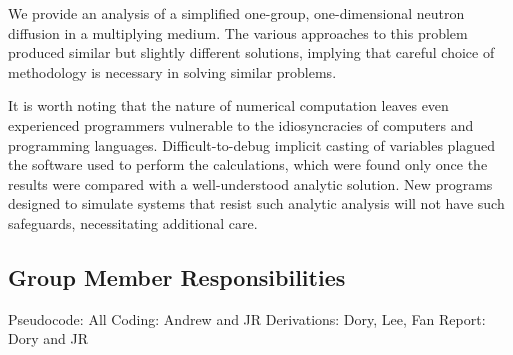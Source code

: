 \documentclass[../main.tex]{subfiles}
\begin{document}
	We provide an analysis of a simplified one-group, one-dimensional neutron diffusion in a multiplying medium. The various approaches to this problem produced similar but slightly different solutions, implying that careful choice of methodology is necessary in solving similar problems. 

	It is worth noting that the nature of numerical computation leaves even experienced programmers vulnerable to the idiosyncracies of computers and programming languages. Difficult-to-debug implicit casting of variables plagued the software used to perform the calculations, which were found only once the results were compared with a well-understood analytic solution. New programs designed to simulate systems that resist such analytic analysis will not have such safeguards, necessitating additional care.

\subsection{Group Member Responsibilities}
Pseudocode: All
Coding: Andrew and JR
Derivations: Dory, Lee, Fan
Report: Dory and JR
\end{document}
